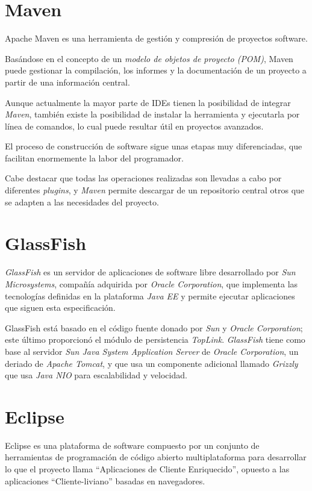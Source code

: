 \section{Maven}
Apache Maven\cite{wiki:maven} es una herramienta de gestión y compresión de proyectos software.

Basándose en el concepto de un \textit{modelo de objetos de proyecto (POM)}, Maven puede gestionar la compilación, los informes y la documentación de un proyecto a partir de una información central.

Aunque actualmente la mayor parte de IDEs tienen la posibilidad de integrar \textit{Maven}, también existe la posibilidad de instalar la herramienta y ejecutarla por línea de comandos, lo cual puede resultar útil en proyectos avanzados.

El proceso de construcción de software sigue unas etapas muy diferenciadas, que facilitan enormemente la labor del programador.

Cabe destacar que todas las operaciones realizadas son llevadas a cabo por diferentes \textit{plugins}, y \textit{Maven} permite descargar de un repositorio central otros que se adapten a las necesidades del proyecto.
\section{GlassFish}
\textit{GlassFish}\cite{wiki:glassfish} es un servidor de aplicaciones de software libre desarrollado por \textit{Sun Microsystems}, compañía adquirida por \textit{Oracle Corporation}, que implementa las tecnologías definidas en la plataforma \textit{Java EE} y permite ejecutar aplicaciones que siguen esta especificación.

GlassFish está basado en el código fuente donado por \textit{Sun} y \textit{Oracle Corporation}; este último proporcionó el módulo de persistencia \textit{TopLink}. \textit{GlassFish} tiene como base al servidor \textit{Sun Java System Application Server} de \textit{Oracle Corporation}, un deriado de \textit{Apache Tomcat}, y que usa un componente adicional llamado \textit{Grizzly} que usa \textit{Java NIO} para escalabilidad y velocidad.
\section{Eclipse}
Eclipse\cite{wiki:eclipse} es una plataforma de software compuesto por un conjunto de herramientas de programación de código abierto multiplataforma para desarrollar lo que el proyecto llama ``Aplicaciones de Cliente Enriquecido'', opuesto a las aplicaciones ``Cliente-liviano'' basadas en navegadores.

